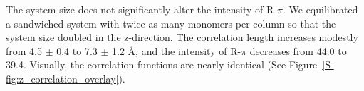 \documentclass[journal=jpcbfk,manuscript=article]{achemso}
\begin{document}
  The system size does not significantly alter the intensity of R-$\pi$. We equilibrated a 
  sandwiched system with twice as many monomers per column so that the system size doubled in 
  the z-direction. The correlation length increases modestly from 4.5 $\pm$ 0.4 to 7.3 $\pm$ 1.2 \AA, 
  and the intensity of R-$\pi$ decreases from 44.0 to 39.4. Visually, the correlation functions
  are nearly identical (See Figure~\ref{S-fig:z_correlation_overlay}). 
  
  
  
\end{document}
